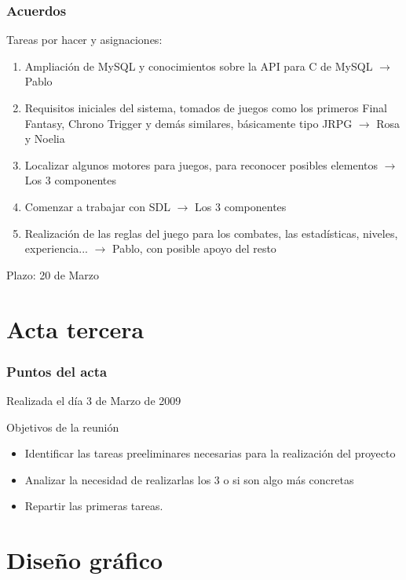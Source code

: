 \documentclass[9pt,xcolor=svgnames]{beamer}
\begin{document}
  \begin{frame}
  \frametitle{Acuerdos}
  \transdissolve
   Tareas por hacer y asignaciones:

   \begin{enumerate}
    \item Ampliación de MySQL y conocimientos sobre la API para C de
	  MySQL $\longrightarrow$ Pablo
    \item Requisitos iniciales del sistema, tomados de juegos como los
	  primeros Final Fantasy, Chrono Trigger y demás similares,
	  básicamente tipo JRPG $\longrightarrow$ Rosa y Noelia
    \item Localizar algunos motores para juegos, para reconocer posibles
	  elementos $\longrightarrow$ Los 3 componentes
    \item Comenzar a trabajar con SDL $\longrightarrow$ Los 3
	  componentes
    \item Realización de las reglas del juego para los combates, las
	  estadísticas, niveles, experiencia... $\longrightarrow$ Pablo,
	  con posible apoyo del resto
   \end{enumerate}
   Plazo: 20 de Marzo
  \end{frame}


  \section{Acta tercera}

 \begin{frame}
  \frametitle{Puntos del acta}
  \transdissolve
  
  Realizada el día 3 de Marzo de 2009

  \begin{block}{Objetivos de la reunión}
   \begin{itemize}
    \item Identificar las tareas preeliminares necesarias para la
	  realización del proyecto
    \item Analizar la necesidad de realizarlas los 3 o si son algo más
	  concretas
    \item Repartir las primeras tareas.
   \end{itemize}
  \end{block}
  
 \end{frame}
  



  \section{Diseño gráfico}  
\end{document}
